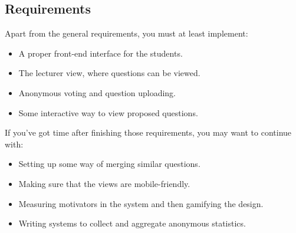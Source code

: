 \begin{refsection}
\subsection{Requirements}
Apart from the general requirements, you must at least implement:
\begin{itemize}
    \item A proper front-end interface for the students.
	\item The lecturer view, where questions can be viewed.
	\item Anonymous voting and question uploading.
    \item Some interactive way to view proposed questions.
\end{itemize}
If you've got time after finishing those requirements, you may want to continue with:
\begin{itemize}
    \item Setting up some way of merging similar questions.
    \item Making sure that the views are mobile-friendly.
	\item Measuring motivators in the system and then gamifying the design.
	\item Writing systems to collect and aggregate anonymous statistics.
\end{itemize}
\end{refsection}


